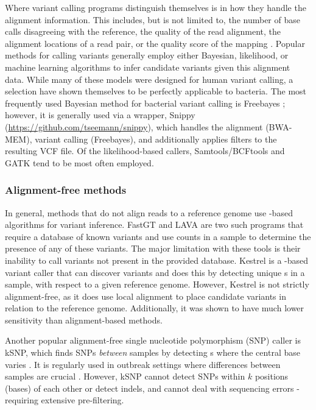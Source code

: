 Where variant calling programs distinguish themselves is in how they handle the alignment information. This includes, but is not limited to, the number of base calls disagreeing with the reference, the quality of the read alignment, the alignment locations of a read pair, or the quality score of the mapping \cite{Olson2015}. Popular methods for calling variants generally employ either Bayesian, likelihood, or machine learning algorithms to infer candidate variants given this alignment data. While many of these models were designed for human variant calling, a selection have shown themselves to be perfectly applicable to bacteria. The most frequently used Bayesian method for bacterial variant calling is Freebayes \cite{Garrison2012}; however, it is generally used via a wrapper, Snippy (\url{https://github.com/tseemann/snippy}), which handles the alignment (BWA-MEM), variant calling (Freebayes), and additionally applies filters to the resulting VCF file. Of the likelihood-based callers, Samtools/BCFtools \cite{bcftools2021,samtools2009} and GATK \cite{Poplin2018} tend to be most often employed. 

\subsubsection{Alignment-free methods}
In general, methods that do not align reads to a reference genome use \kmer{}-based algorithms for variant inference. FastGT \cite{fastgt2017} and LAVA \cite{lava2016} are two such programs that require a database of known variants and use \kmer{} counts in a sample to determine the presence of any of these variants. The major limitation with these tools is their inability to call variants not present in the provided database. Kestrel \cite{kestrel2017} is a \kmer{}-based variant caller that can \denovo{} discover variants and does this by detecting unique \kmer{}s in a sample, with respect to a given reference genome. However, Kestrel is not strictly alignment-free, as it does use local alignment to place candidate variants in relation to the reference genome. Additionally, it was shown to have much lower sensitivity than alignment-based methods. 

Another popular alignment-free single nucleotide polymorphism (SNP) caller is kSNP, which finds SNPs \emph{between} samples by detecting \kmer{}s where the central base varies \cite{ksnp2015}. It is regularly used in outbreak settings where differences between samples are crucial \cite{Bazan2017,Raphael2016,Chochua2017}. However, kSNP cannot detect SNPs within $k$ positions (bases) of each other or detect indels, and cannot deal with sequencing errors - requiring extensive pre-filtering.

